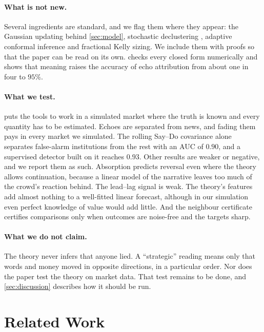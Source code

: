 \documentclass[11pt,a4paper]{article}
\theoremstyle{plain}
\theoremstyle{definition}
\theoremstyle{remark}
\begin{document}
\paragraph{What is not new.} Several ingredients are standard, and we flag them where they appear: the Gaussian updating behind \cref{sec:model}, stochastic declustering \citep{zhuang2002}, adaptive conformal inference \citep{gibbs2021} and fractional Kelly sizing. We include them with proofs so that the paper can be read on its own.  checks every closed form numerically and shows that meaning raises the accuracy of echo attribution from about one in four to $95\%$.

\paragraph{What we test.}  puts the tools to work in a simulated market where the truth is known and every quantity has to be estimated. Echoes are separated from news, and fading them pays in every market we simulated. The rolling Say--Do covariance alone separates false-alarm institutions from the rest with an AUC of $0.90$, and a supervised detector built on it reaches $0.93$. Other results are weaker or negative, and we report them as such. Absorption predicts reversal even where the theory allows continuation, because a linear model of the narrative leaves too much of the crowd's reaction behind. The lead--lag signal is weak. The theory's features add almost nothing to a well-fitted linear forecast, although in our simulation even perfect knowledge of value would add little. And the neighbour certificate certifies comparisons only when outcomes are noise-free and the targets sharp.

\paragraph{What we do not claim.} The theory never infers that anyone lied. A ``strategic'' reading means only that words and money moved in opposite directions, in a particular order. Nor does the paper test the theory on market data. That test remains to be done, and \cref{sec:discussion} describes how it should be run.

\section{Related Work}\label{sec:related}
\end{document}
